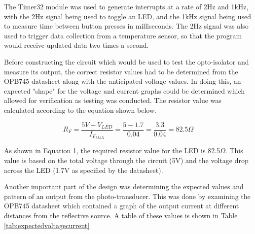 \documentclass[conference]{IEEEtran}
\begin{document}
The Timer32 module was used to generate interrupts at a rate of 2Hz and
1kHz, with the 2Hz signal being used to toggle an LED, and the 1kHz signal
being used to measure time between button presses in milliseconds. The 2Hz
signal was also used to trigger data collection from a temperature sensor,
so that the program would receive updated data two times a second.

Before constructing the circuit which would be used to test the opto-isolator and measure its output, the correct resistor values
had to be determined from the OPB745 datasheet along with the anticipated voltage values. In doing this, an expected "shape" for the
voltage and current graphs could be determined which allowed for verification as testing was conducted. The resistor value was
calculated according to the equation shown below.

\begin{equation}
    R_F=\frac{5V-V_{LED}}{I_{F_{MAX}}}=\frac{5-1.7}{0.04}=\frac{3.3}{0.04}=82.5\Omega
\end{equation}

As shown in Equation 1, the required resistor value for the LED is 82.5$\Omega$. This value is based on the total voltage through the
circuit (5V) and the voltage drop across the LED (1.7V as specified by the datasheet).

Another important part of the design was determining the expected values and pattern of an output from the photo-transducer. This was
done by examining the OPB745 datasheet which contained a graph of the output current at different distances from the reflective source.
A table of these values is shown in Table \ref{tab:expectedvoltagecurrent}
\end{document}
